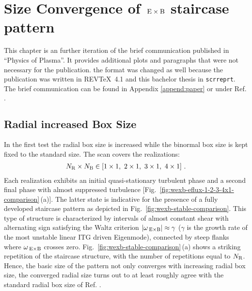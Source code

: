 
\newpage
\section{Size Convergence of $\mathrm{\:E}\times\mathrm{B}$ staircase pattern}
\label{sec:convergence}

This chapter is an further iteration of the brief communication published in \enquote{Physics of Plasma}. It provides additional plots and paragraphs that were not necessary for the publication. the format was changed as well because the publication was written in REV\TeX~4.1 and this bachelor thesis in \texttt{scrreprt}. The brief communication can be found in Appendix \ref{append:paper} or under Ref. .

\subsection{Radial increased Box Size}
\label{sub:radial}

In the first test the radial box size is increased while the binormal box size is kept fixed to the standard size. The scan covers the realizations: 
\begin{gather*}
	N_\mathrm{R} \times N_\mathrm{B} \in [1\times1,~2\times1,~3\times1,~4\times1]~.
\end{gather*}
Each realization exhibits an initial quasi-stationary turbulent phase and a second final \cite{peeters2016} phase with almost suppressed turbulence [Fig.~\ref{fig:wexb-eflux-1-2-3-4x1-comparison}\,(a)].
The latter state is indicative for the presence of a fully developed staircase pattern as depicted in Fig.~\ref{fig:wexb-stable-comparison}. 
This type of structure is characterized by intervals of almost constant shear with alternating sign satisfying the Waltz criterion $|\omega_{\mathrm{\:E \times B}}| \approx \gamma$\cite{doi:10.1063/1.870934, doi:10.1063/1.872847} ($\gamma$ is the growth rate of the most unstable linear ITG driven Eigenmode), connected by steep flanks where $\omega_{\mathrm{\:E \times B}}$ crosses zero.
Fig.~\ref{fig:wexb-stable-comparison}\,(a) shows a striking repetition of the staircase structure, with the number of repetitions equal to $N_\mathrm{R}$.
Hence, the basic size of the pattern not only converges with increasing radial box size, the converged radial size turns out to at least roughly agree with the standard radial box size of Ref. . \bigskip

